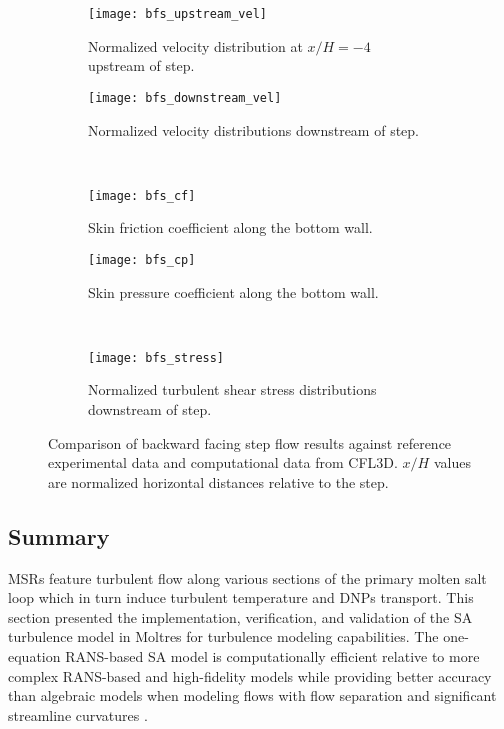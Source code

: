 \begin{figure}[htb]
  \centering
  \hfill
  \begin{subfigure}[b]{0.38\columnwidth}
    \centering
    \texttt{[image: bfs\_upstream\_vel]}
    \caption{Normalized velocity distribution at $x/H=-4$ upstream of step.}
    \label{fig:bfs-upstream}
  \end{subfigure}
  \hfill
  \begin{subfigure}[b]{0.38\columnwidth}
    \centering
    \texttt{[image: bfs\_downstream\_vel]}
    \caption{Normalized velocity distributions downstream of step.}
    \label{fig:bfs-downstream}
  \end{subfigure} \hfill \\
  \centering
  \hfill
  \begin{subfigure}[b]{0.38\columnwidth}
    \centering
    \texttt{[image: bfs\_cf]}
    \caption{Skin friction coefficient along the bottom wall.}
    \label{fig:bfs-cf}
  \end{subfigure}
  \hfill
  \begin{subfigure}[b]{0.38\columnwidth}
    \centering
    \texttt{[image: bfs\_cp]}
    \caption{Skin pressure coefficient along the bottom wall.}
    \label{fig:bfs-cp}
  \end{subfigure} \hfill \\
  \centering
  \begin{subfigure}[b]{0.38\columnwidth}
    \centering
    \texttt{[image: bfs\_stress]}
    \caption{Normalized turbulent shear stress distributions downstream
    of step.}
    \label{fig:bfs-stress}
  \end{subfigure}
  \caption{Comparison of backward facing step flow results against reference
  experimental data and computational data from CFL3D. $x/H$ values are normalized horizontal
  distances relative to the step.}
  \label{fig:bfs-plots}
\end{figure}

\subsection{Summary}

\glspl{MSR} feature turbulent flow along various sections of the primary molten salt loop which in
turn induce turbulent temperature and \glspl{DNP} transport. This section presented the
implementation, verification, and validation of the \gls{SA} turbulence model
\cite{spalart_one-equation_1994} in Moltres for turbulence
modeling capabilities. The one-equation \gls{RANS}-based \gls{SA} model is computationally
efficient relative to more complex \gls{RANS}-based and high-fidelity models while providing better
accuracy than algebraic models when modeling flows with flow separation and significant streamline
curvatures \cite{wilcox_turbulence_2006}.

